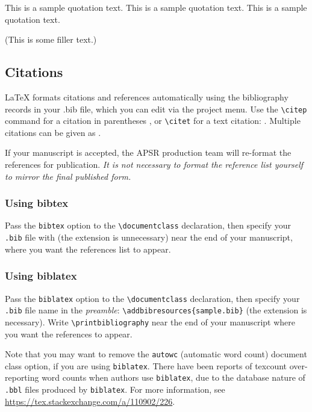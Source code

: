 \documentclass[bibtex,autowc]{apsr_submission}
\begin{document}
\begin{quoting}
This is a sample quotation text. This is a sample quotation text. This is a sample quotation text.
\end{quoting}

(This is some filler text.) \lipsum[2]

\subsection{Citations}

\LaTeX{} formats citations and references automatically using the bibliography records in your .bib file, which you can edit via the project menu. Use the \verb|\citep| command for a citation in parentheses \citep{greenwade93}, or  \verb|\citet| for a text citation: \citet{greenwade93}. Multiple citations can be given as \citep{greenwade93,knuth1984texbook}.

If your manuscript is accepted, the APSR production team will re-format the references for publication. \emph{It is not necessary to format the reference list yourself to mirror the final published form.}

\subsubsection{Using bibtex} Pass the \texttt{bibtex} option to the \verb|\documentclass| declaration, then specify your \texttt{.bib} file with \verb|| (the extension is unnecessary) near the end of your manuscript, where you want the references list to appear.

\subsubsection{Using biblatex} Pass the \texttt{biblatex} option to the \verb|\documentclass| declaration, then specify your \texttt{.bib} file name in the \emph{preamble}: \verb|\addbibresources{sample.bib}| (the extension is necessary). Write \verb|\printbibliography| near the end of your manuscript where you want the references to appear.

Note that you may want to remove the \texttt{autowc} (automatic word count) document class option, if you are using \texttt{biblatex}. There have been reports of texcount over-reporting word counts when authors use \texttt{biblatex}, due to the database nature of \texttt{.bbl} files produced by \texttt{biblatex}. For more information, see \url{https://tex.stackexchange.com/a/110902/226}.
\end{document}
